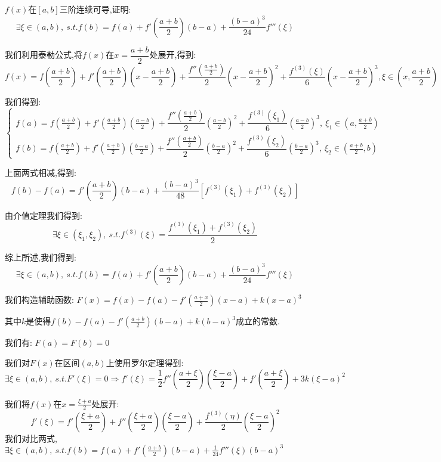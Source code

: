\begin{proposition}
	$f(x)$在$[a,b]$三阶连续可导,证明: $$\exists \xi\in(a,b),\ s.t. f(b)=f(a)+f'(\dfrac{a+b}{2})(b-a)+\dfrac{(b-a)^3}{24}f'''(\xi)$$
\end{proposition}
\begin{solution}

	我们利用泰勒公式,将$f(x)$在$x=\dfrac{a+b}{2}$处展开,得到:
	$$f(x)=f(\frac{a+b}{2})+f'(\frac{a+b}{2})(x-\frac{a+b}{2})+\dfrac{f''(\frac{a+b}{2})}{2}(x-\frac{a+b}{2})^2+\dfrac{f^{(3)}(\xi)}{6}(x-\frac{a+b}{2})^3,\xi\in(x,\frac{a+b}{2})$$

	我们得到:
	$$\left\lbrace
		\begin{array}{l}
			f(a)=f(\frac{a+b}{2})+f'(\frac{a+b}{2})(\frac{a-b}{2})+\dfrac{f''(\frac{a+b}{2})}{2}(\frac{a-b}{2})^2+\dfrac{f^{(3)}(\xi_{1})}{6}(\frac{a-b}{2})^3,\ \xi_{1}\in (a,\frac{a+b}{2}) \\
			f(b)=f(\frac{a+b}{2})+f'(\frac{a+b}{2})(\frac{b-a}{2})+\dfrac{f''(\frac{a+b}{2})}{2}(\frac{b-a}{2})^2+\dfrac{f^{(3)}(\xi_{2})}{6}(\frac{b-a}{2})^3,\ \xi_{2}\in(\frac{a+b}{2},b)
		\end{array}
		\right. $$

	上面两式相减,得到:
	$$f(b)-f(a)=f'(\frac{a+b}{2})(b-a)+\dfrac{(b-a)^3}{48}[f^{(3)}(\xi_{1})+f^{(3)}(\xi_{2})]$$

	由介值定理我们得到:
	$$\exists\xi\in(\xi_{1},\xi_{2}),\ s.t. f^{(3)}(\xi)=\dfrac{f^{(3)}(\xi_{1})+f^{(3)}(\xi_{2})}{2}$$

	综上所述,我们得到:
	$$\exists \xi\in(a,b),\ s.t. f(b)=f(a)+f'(\dfrac{a+b}{2})(b-a)+\dfrac{(b-a)^3}{24}f'''(\xi)$$
\end{solution}
\begin{anymark}[常数$K$值法]
	我们构造辅助函数: $F(x)=f(x)-f(a)-f'(\frac{a+x}{2})(x-a)+k(x-a)^3$

	其中$k$是使得$f(b)-f(a)-f'(\frac{a+b}{2})(b-a)+k(b-a)^3$成立的常数.

	我们有: $F(a)=F(b)=0$

	我们对$F(x)$在区间$(a,b)$上使用罗尔定理得到:
	$$\exists\xi\in(a,b),\ s.t. F'(\xi)=0\Rightarrow f'(\xi)=\frac{1}{2}f''(\frac{a+\xi}{2})(\frac{\xi-a}{2})+f'(\frac{a+\xi}{2})+3k(\xi-a)^2$$

	我们将$f(x)$在$x=\frac{\xi+a}{2}$处展开:
	$$f'(\xi)=f'(\frac{\xi+a}{2})+f''(\frac{\xi+a}{2})(\frac{\xi-a}{2})+\frac{f^{(3)}(\eta)}{2}(\frac{\xi-a}{2})^2$$
	我们对比两式,$\exists \xi\in(a,b),\ s.t. f(b)=f(a)+f'(\frac{a+b}{2})(b-a)+\frac{1}{24}f'''(\xi)(b-a)^3$
\end{anymark}


